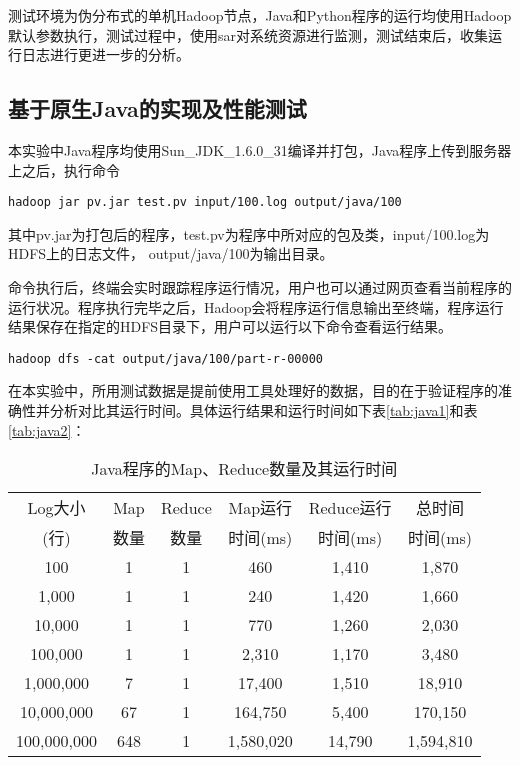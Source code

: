 测试环境为伪分布式的单机Hadoop节点，Java和Python程序的运行均使用Hadoop默认参数执行，测试过程中，使用sar对系统资源进行监测，测试结束后，收集运行日志进行更进一步的分析。


\subsection{基于原生Java的实现及性能测试}
本实验中Java程序均使用Sun\_JDK\_1.6.0\_31编译并打包，Java程序上传到服务器上之后，执行命令

\begin{verbatim}
hadoop jar pv.jar test.pv input/100.log output/java/100
\end{verbatim}

其中pv.jar为打包后的程序，test.pv为程序中所对应的包及类，input/100.log为HDFS上的日志文件， output/java/100为输出目录。

命令执行后，终端会实时跟踪程序运行情况，用户也可以通过网页查看当前程序的运行状况。程序执行完毕之后，Hadoop会将程序运行信息输出至终端，程序运行结果保存在指定的HDFS目录下，用户可以运行以下命令查看运行结果。
\begin{verbatim}
hadoop dfs -cat output/java/100/part-r-00000
\end{verbatim}
在本实验中，所用测试数据是提前使用工具处理好的数据，目的在于验证程序的准确性并分析对比其运行时间。具体运行结果和运行时间如下表\ref{tab:java1}和表\ref{tab:java2}：

\begin{table}[htbp]
 \caption{\label{tab:java}Java程序的Map、Reduce数量及其运行时间}
 \centering
 \begin{tabular}{cccccc}
  \toprule
  Log大小 & Map & Reduce & Map运行 & Reduce运行 & 总时间\\
  (行) & 数量 & 数量 & 时间(ms) & 时间(ms) & 时间(ms)\\
  \midrule
  100 & 1 & 1 & 460 & 1,410 & 1,870\\
  1,000 & 1 & 1 & 240 & 1,420 & 1,660\\
  10,000 & 1 & 1 & 770 & 1,260 & 2,030\\
  100,000 & 1 & 1 & 2,310 & 1,170 & 3,480\\
  1,000,000 & 7 & 1 & 17,400 & 1,510 & 18,910\\
  10,000,000 & 67 & 1 & 164,750 & 5,400 & 170,150\\
  100,000,000 & 648 & 1 & 1,580,020 & 14,790 & 1,594,810\\
  \bottomrule
 \end{tabular}
\end{table}


